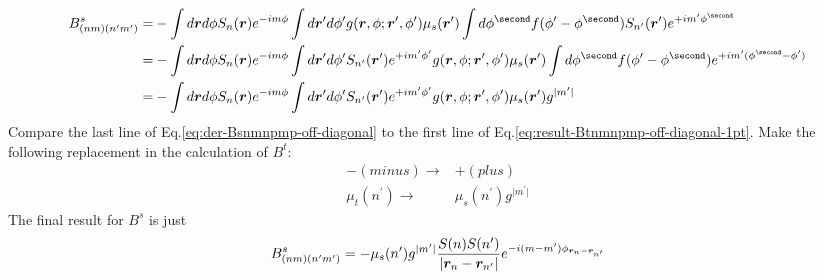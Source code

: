 \documentclass [10pt,letterpaper]{article}
\renewcommand{\vec}{\vectorsym}
\begin{document}
\begin{equation} \label{eq:der-Bsnmnpmp-off-diagonal}
	\begin{split}
		B^s_{(n m)(n^\prime m^\prime)}
		=&
		-\int d\vec{r} d\phi
		S_n(\vec{r})
		e^{-i m \phi}
		\int d\vec{r}^\prime d\phi^\prime
		g(\vec{r},\phi;\vec{r}^\prime,\phi^\prime)
		\mu_s(\vec{r}^\prime)
		\int d\phi^\second
		f(\phi^\prime-\phi^\second)
		S_{n^\prime}(\vec{r}^\prime)
		e^{+i m^\prime \phi^\second}
		\\
		=&
		-\int d\vec{r} d\phi
		S_n(\vec{r})
		e^{-i m \phi}
		\int d\vec{r}^\prime d\phi^\prime
		S_{n^\prime}(\vec{r}^\prime)
		e^{+i m^\prime \phi^\prime}
		g(\vec{r},\phi;\vec{r}^\prime,\phi^\prime)
		\mu_s(\vec{r}^\prime)
		\int d\phi^\second
		f(\phi^\prime-\phi^\second)
		e^{+i m^\prime (\phi^\second-\phi^\prime)}
		\\
		=&
		-\int d\vec{r} d\phi
		S_n(\vec{r})
		e^{-i m \phi}
		\int d\vec{r}^\prime d\phi^\prime
		S_{n^\prime}(\vec{r}^\prime)
		e^{+i m^\prime \phi^\prime}
		g(\vec{r},\phi;\vec{r}^\prime,\phi^\prime)
		\mu_s(\vec{r}^\prime)
		g^{\lvert m^\prime \rvert}
	\end{split}
\end{equation}
Compare the last line of Eq.\eqref{eq:der-Bsnmnpmp-off-diagonal} to the first line of Eq.\eqref{eq:result-Btnmnpmp-off-diagonal-1pt}. Make the following replacement in the calculation of $B^t$:
\begin{align*}
	-(minus)	 \rightarrow & +(plus)
	\\
	\mu_t(n^\prime)	 \rightarrow & \mu_s(n^\prime)g^{\lvert m^\prime \rvert}
\end{align*}
The final result for $B^s$ is just
\begin{equation} \label{eq:result-Bsnmnpmp-off-diagonal-1pt}
	B^s_{(n m)(n^\prime m^\prime)}
	=
	-
	\mu_s(n^\prime)g^{\lvert m^\prime \rvert} 
	\frac{S(n) S(n^\prime)}{\lvert\vec{r}_n-\vec{r}_{n^\prime}\rvert}
	e^{-i (m-m^\prime) \phi_{\vec{r}_n-\vec{r}_{n^\prime}}}
\end{equation}
\end{document}

